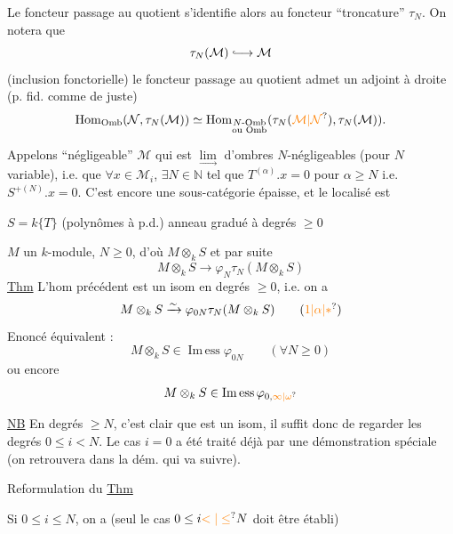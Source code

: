 Le foncteur passage au quotient s'identifie alors au foncteur ``troncature'' $\tau_N$. On notera que
\[
\tau_N(\mathcal M)\lhook\joinrel\longrightarrow\mathcal M
\]
(inclusion fonctorielle)  le foncteur  passage au quotient admet un adjoint à droite (p. fid. comme de juste)
\[
\operatorname{Hom}_{\mathrm{Omb}}(\mathcal N,\tau_N(\mathcal M))\simeq\operatorname{Hom}_{\substack{N\text{-}\mathrm{Omb}\\\text{ou }\mathrm{Omb}}}(\tau_N(\unsure{\mathcal M|\mathcal N}),\tau_N(\mathcal M)).
\]

Appelons ``négligeable''  $\mathcal M$ qui est $\underset{\longrightarrow}{\lim}$  d'ombres $N$-négligeables (pour $N$ variable), i.e.  que  $\forall x\in\mathcal M_i$, $\exists N\in\mathbb{N}$ tel que $T^{(\alpha)}.x=0$ pour $\alpha\geq N$ i.e. $S^{+(N)}.x=0$. C'est encore une sous-catégorie épaisse, et le localisé est

$S=k\{T\}$ (polynômes à p.d.) anneau gradué à degrés $\geq0$

$M$ un $k$-module, $N\geq0$, d'où $M\otimes_k S$ et par suite
\[
M\otimes_k S\longrightarrow\varphi_N\tau_N(M\otimes_k S)
\]
\uline{Thm} L'hom précédent est un isom en degrés $\geq0$, i.e. on a
\[
M\otimes_k S\xrightarrow{\sim}\varphi_{0N}\tau_N(M\otimes_k S)\tag*{(\unsure{$1$|$\alpha$|$*$})}
\]
Enoncé équivalent :
\[
M\otimes_k S\in\operatorname{Im\,ess}\varphi_{0N}\qquad(\forall N\geq0)
\]
ou encore
\[
M\otimes_k S\in\operatorname{Im\,ess}\varphi_{0,\unsure{\infty|\omega}}
\]

\uline{NB} En degrés $\geq N$, c'est clair que  est un isom, il suffit donc de regarder les degrés $0\leq i<N$. Le cas $i=0$ a été traité déjà par une démonstration spéciale (on  retrouvera dans la dém. qui va suivre).

Reformulation du \uline{Thm}

Si $0\leq i\leq N$, on a
(seul le cas $0\leq i\unsure{<|\leq}N$ doit être établi)

